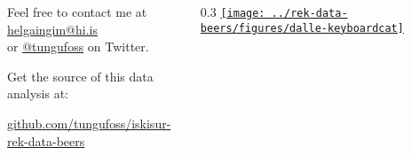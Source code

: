 \begin{columns}[T]
    \begin{column}{0.6\textwidth}

        Feel free to contact me at \href{mailto:helgaingim@hi.is}{helgaingim@hi.is} \\
        or \href{https://twitter.com/tungufoss}{@tungufoss} on Twitter.

            \vspace{12pt}

        Get the source of this data analysis at:
        \begin{center}
        \url{github.com/tungufoss/iskisur-rek-data-beers}

        \vspace{6pt}

        \ccbysa
        \end{center}
    \end{column}
    \begin{column} {0.3\textwidth}
        \href{https://www.youtube.com/watch?v=DK7CVqbtW0A}{
            \texttt{[image: ../rek-data-beers/figures/dalle-keyboardcat]}
        }
    \end{column}
\end{columns}
